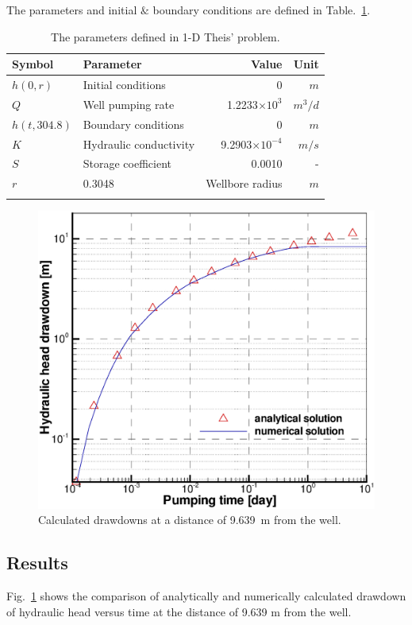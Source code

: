 The parameters and initial $\&$ boundary conditions are defined in Table.~\ref{1dTheis}.

\begin{table}[htb]
\caption{The parameters defined in 1-D Theis' problem.}
\centering
\begin{tabular*}{0.9\textwidth}{@{\extracolsep{\fill}}llrr}
\hline\noalign{\smallskip}
{Symbol} &{Parameter}& {Value} & {Unit} \\ 
\hline\noalign{\smallskip}
 $h(0,r)$  & Initial conditions & 0 & $m$  \\
 $Q$   & Well pumping rate      & 1.2233$\times 10^{3}$ & $m^{3}/d$  \\
 $h(t,304.8) $ & Boundary conditions  &0 & $m$  \\
  \hline\noalign{\smallskip}
 $K$ & Hydraulic conductivity & 9.2903$\times 10^{-4}$ & $m/s$  \\
 $S$ & Storage coefficient & 0.0010& -   \\
 $r$&0.3048 & Wellbore radius &  $m$ \\
  \noalign{\smallskip}\hline
\end{tabular*}
\label{1dTheis}
\end{table}
%
\begin{figure} [htb]
 \centering
\includegraphics[width=0.7\columnwidth] {Chapter5/figure/Theis1.eps}
\caption{Calculated drawdowns at a distance of 9.639~m from the well.}
 \label{Theis1}
\end{figure}
%
%
\subsection{Results}
Fig.~\ref{Theis1} shows the comparison of analytically and numerically calculated drawdown of hydraulic head versus time at the distance of 9.639 m from the well.
%
